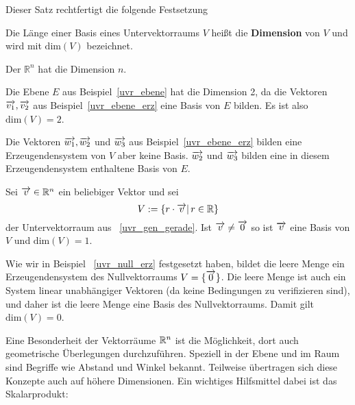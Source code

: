 Dieser Satz rechtfertigt die folgende Festsetzung

\begin{definition} Die Länge einer Basis eines Untervektorraums $V$ heißt 
die \textbf{Dimension} von $V$ und wird mit $\textrm{dim}(V)$ bezeichnet.
\end{definition}

\begin{beispiel} Der $\mathbb R^n$ hat die Dimension $n$.
\end{beispiel}

\begin{beispiel} Die Ebene $E$ aus Beispiel~\ref{uvr_ebene} hat die Dimension 2, da die Vektoren 
$ \overrightarrow{v_1}, \overrightarrow{v_2}$ aus Beispiel~\ref{uvr_ebene_erz} eine Basis von $E$ bilden. 
Es ist also $\textrm{dim}(V) = 2$. 

Die Vektoren 
$\overrightarrow{w_1}, \overrightarrow{w_2}$ und $\overrightarrow{w_3}$ aus Beispiel~\ref{uvr_ebene_erz} bilden 
eine  Erzeugendensystem von $V$ aber keine Basis. $\overrightarrow{w_2}$ und $\overrightarrow{w_3}$ bilden eine 
in diesem Erzeugendensystem enthaltene Basis von $E$.
\end{beispiel}

\begin{beispiel} Sei $\overrightarrow{v} \in \mathbb R^n$ ein beliebiger Vektor und sei
  	$$ V := \{ r \cdot \overrightarrow{v} \vert \, r \in \mathbb R \} $$
der Untervektorraum aus ~\ref{uvr_gen_gerade}. Ist $\overrightarrow{v} \neq \overrightarrow{0}$ so ist 
$\overrightarrow{v}$ eine Basis von $V$ und $\textrm{dim}(V) = 1$.
\end{beispiel}

\begin{beispiel} Wie wir in Beispiel ~\ref{uvr_null_erz} festgesetzt haben, bildet die leere Menge ein 
Erzeugendensystem des Nullvektorraums $V = \{\overrightarrow{0} \}$. Die leere Menge ist auch ein System 
linear unabhängiger Vektoren (da keine Bedingungen zu verifizieren sind), und daher ist die leere Menge 
eine Basis des Nullvektorraums. Damit gilt $\textrm{dim}(V) = 0$.
\end{beispiel}

\bigbreak

Eine Besonderheit der Vektorräume $\mathbb R^n$ ist die Möglichkeit, dort auch geometrische Überlegungen durchzuführen. 
Speziell in der Ebene und im Raum sind Begriffe wie Abstand und Winkel bekannt. Teilweise übertragen sich diese 
Konzepte auch auf höhere Dimensionen. Ein wichtiges Hilfsmittel dabei ist das Skalarprodukt:

